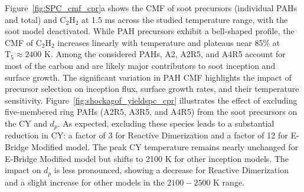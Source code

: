 
Figure~\ref{fig:SPC_cmf_cpr}a shows the CMF of soot precursors (individual PAHs and total) and $\mathrm{C_2H_2}$ at 1.5 ms across the studied temperature range, with the soot model deactivated. While PAH precursors exhibit a bell-shaped profile, the CMF of $\mathrm{C_2H_2}$ increases linearly with temperature and plateaus near 85\% at $\mathrm{T_5} \approx 2400$ K. Among the considered PAHs, A2, A2R5, and A4R5 account for most of the carbon and are likely major contributors to soot inception and surface growth. The significant variation in PAH CMF highlights the impact of precursor selection on inception flux, surface growth rates, and their temperature sensitivity. Figure~\ref{fig:shockagof_yieldspc_cpr} illustrates the effect of excluding five-membered ring PAHs (A2R5, A3R5, and A4R5) from the soot precursors on the CY and $d_p$. As expected, excluding these species leads to a substantial reduction in CY: a factor of 3 for Reactive Dimerization and a factor of 12 for E-Bridge Modified model. The peak CY temperature remains nearly unchanged for E-Bridge Modified model but shifts to 2100 K for other inception models. The impact on $d_p$ is less pronounced, showing a decrease for Reactive Dimerization and a slight increase for other models in the $2100-2500$ K range.

